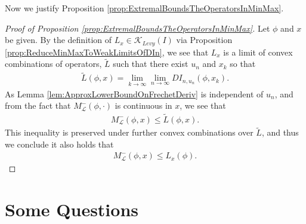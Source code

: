 \documentclass[11pt,reqno]{amsart}
\numberwithin{equation}{section}
\theoremstyle{plain}
\def\K{\mathcal K}
\def\L{\mathcal L}
\begin{document}
Now we justify Proposition \ref{prop:ExtremalBoundsTheOperatorsInMinMax}.

\begin{proof}[Proof of Proposition \ref{prop:ExtremalBoundsTheOperatorsInMinMax}]
	
	Let $\phi$ and $x$ be given.  By the definition of $L_x\in \K_{Levy}(I)$ via Proposition \ref{prop:ReduceMinMaxToWeakLimitsOfDIn}, we see that $L_x$ is a limit of convex combinations of operators, $\tilde L$ such that there exist $u_n$ and $x_k$ so that 
	\begin{align*}
		\tilde L(\phi,x) = \lim_{k\to\infty}\lim_{n\to\infty} DI_{n,u_n}(\phi,x_k).
	\end{align*}
	As Lemma \ref{lem:ApproxLowerBoundOnFrechetDeriv} is independent of $u_n$, and from the fact that $M^-_\L(\phi,\cdot)$ is continuous in $x$,  we see that 
	\begin{align*}
		M^-_\L(\phi,x)\leq \tilde L(\phi,x).
	\end{align*}
	This inequality is preserved under further convex combinations over $\tilde L$, and thus we conclude it also holds that
	\begin{align*}
		M^-_\L(\phi,x)\leq L_x(\phi).
	\end{align*}
\end{proof}


\section{Some Questions}\label{sec: Further Questions}
\setcounter{equation}{0}
\end{document}
